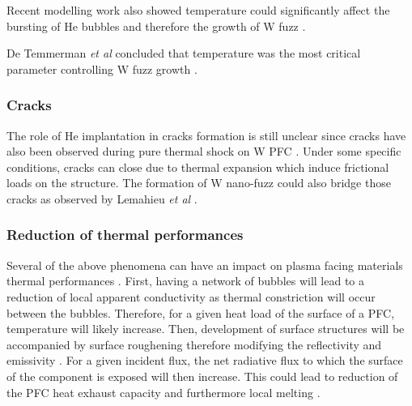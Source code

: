 Recent modelling work also showed temperature could significantly affect the bursting of He bubbles and therefore the growth of W fuzz .

De Temmerman \textit{et al} concluded that temperature was the most critical parameter controlling W fuzz growth .

\subsubsection{Cracks}

The role of He implantation in cracks formation is still unclear since cracks have also been observed during pure thermal shock on W PFC .
Under some specific conditions, cracks can close due to thermal expansion which induce frictional loads on the structure.
The formation of W nano-fuzz could also bridge those cracks as observed by Lemahieu \textit{et al} .

\subsubsection{Reduction of thermal performances}

Several of the above phenomena can have an impact on plasma facing materials thermal performances .
First, having a network of bubbles will lead to a reduction of local apparent conductivity as thermal constriction will occur between the bubbles.
Therefore, for a given heat load of the surface of a PFC, temperature will likely increase.
Then, development of surface structures will be accompanied by surface roughening therefore modifying the reflectivity and emissivity .
For a given incident flux, the net radiative flux to which the surface of the component is exposed will then increase.
This could lead to reduction of the PFC heat exhaust capacity and furthermore local melting .




